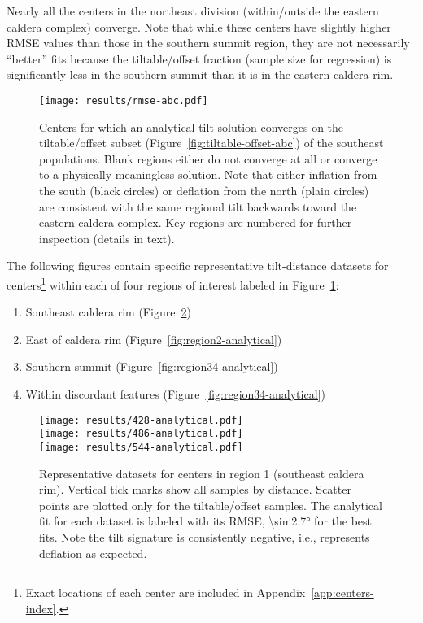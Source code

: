 Nearly all the centers in the northeast division (within/outside the eastern caldera complex) converge. Note that while these centers have slightly higher \acs{RMSE} values than those in the southern summit region, they are not necessarily ``better'' fits because the tiltable/offset fraction (sample size for regression) is significantly less in the southern summit than it is in the eastern caldera rim.

\begin{figure}
    \texttt{[image: results/rmse-abc.pdf]}%
    \caption[Centers by analytical convergence]{Centers for which an analytical tilt solution converges on the tiltable/offset subset (Figure~\ref{fig:tiltable-offset-abc}) of the southeast populations. Blank regions either do not converge at all or converge to a physically meaningless solution. Note that either inflation from the south (black circles) or deflation from the north (plain circles) are consistent with the same regional tilt backwards toward the eastern caldera complex. Key regions are numbered for further inspection (details in text).}%
    \label{fig:rmse-abc}
\end{figure}

The following figures contain specific representative tilt-distance datasets for centers\footnote{Exact locations of each center are included in Appendix~\ref{app:centers-index}.} within each of four regions of interest labeled in Figure~\ref{fig:rmse-abc}:

\begin{enumerate}
    \item Southeast caldera rim (Figure~\ref{fig:region1-analytical})
    \item East of caldera rim (Figure~\ref{fig:region2-analytical})
    \item Southern summit (Figure~\ref{fig:region34-analytical})
    \item Within discordant features (Figure~\ref{fig:region34-analytical})
\end{enumerate}

\begin{figure}
    \vspace{-15pt}
    \texttt{[image: results/428-analytical.pdf]}\\
    \texttt{[image: results/486-analytical.pdf]}\\
    \texttt{[image: results/544-analytical.pdf]}%
    \caption[Southeast caldera rim: analytical fit]{Representative datasets for centers in region 1 (southeast caldera rim). Vertical tick marks show all samples by  distance. Scatter points are plotted only for the tiltable/offset samples. The analytical fit for each dataset is labeled with its \acs{RMSE}, \ang{\sim2.7} for the best fits. Note the tilt signature is consistently negative, i.e., represents deflation as expected.}
    \label{fig:region1-analytical}
\end{figure}

